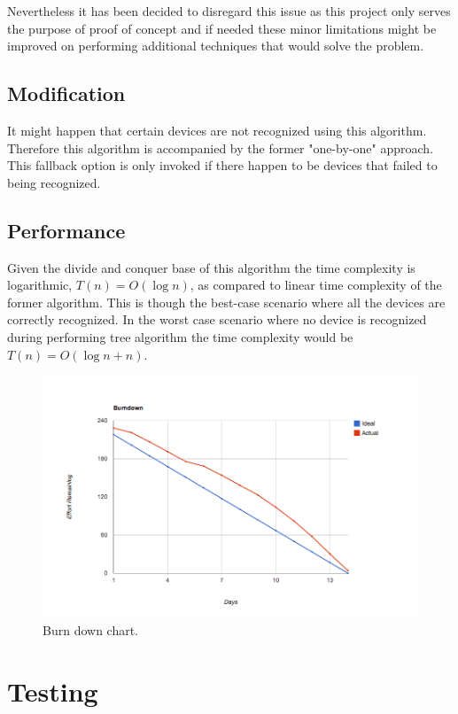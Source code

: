 Nevertheless it has been decided to disregard this issue as this project only serves the purpose of proof of concept and if needed these minor limitations might be improved on performing additional techniques that would solve the problem.

\subsection{Modification}
It might happen that certain devices are not recognized using this algorithm. Therefore this algorithm is accompanied by the former "one-by-one" approach. This fallback option is only invoked if there happen to be devices that failed to being recognized.

\subsection{Performance}
Given the divide and conquer base of this algorithm the time complexity is logarithmic, $T(n) = O(\log n)$, as compared to linear time complexity of the former algorithm. This is though the best-case scenario where all the devices are correctly recognized. In the worst case scenario where no device is recognized during performing tree algorithm the time complexity would be $T(n) = O(\log n + n)$.

\begin{figure}[H]
	\centering
		\includegraphics[width=18cm]{sprint5/BurndownSprint5.png}
	\caption{Burn down chart.}
	\label{fig:Burn5 }
\end{figure}

\section{Testing}
